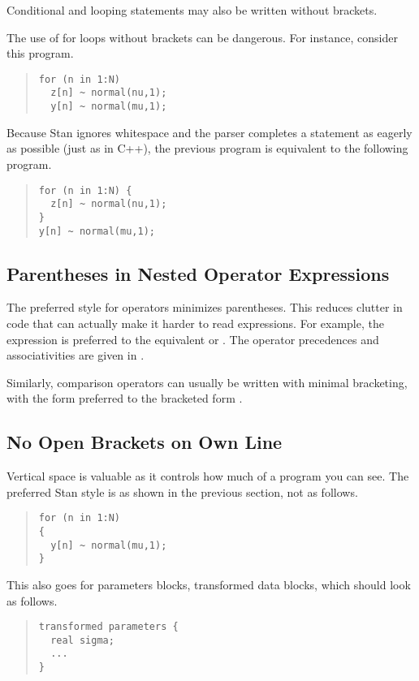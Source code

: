 Conditional and looping statements may also be written without brackets.

The use of for loops without brackets can be dangerous.  For instance,
consider this program.
%
\begin{quote}
\begin{Verbatim}  
for (n in 1:N)
  z[n] ~ normal(nu,1);
  y[n] ~ normal(mu,1);
\end{Verbatim}
\end{quote}
%
Because Stan ignores whitespace and the parser completes a statement
as eagerly as possible (just as in C++), the previous program is
equivalent to the following program.
%
\begin{quote}
\begin{Verbatim}  
for (n in 1:N) {
  z[n] ~ normal(nu,1);
}
y[n] ~ normal(mu,1);
\end{Verbatim}
\end{quote}
%


\subsection{Parentheses in Nested Operator Expressions}

The preferred style for operators minimizes parentheses.  This reduces
clutter in code that can actually make it harder to read expressions.
For example, the expression  is preferred to the
equivalent  or .  The operator
precedences and associativities are given in
.

Similarly, comparison operators can usually be written with minimal
bracketing, with the form  preferred to
the bracketed form .  

\subsection{No Open Brackets on Own Line}

Vertical space is valuable as it controls how much of a program you
can see.  The preferred Stan style is as shown in the previous
section, not as follows.
%
\begin{quote}
\begin{Verbatim}
for (n in 1:N) 
{
  y[n] ~ normal(mu,1);
}
\end{Verbatim}
\end{quote}
%
This also goes for parameters blocks, transformed data blocks, 
which should look as follows.
%
\begin{quote}
\begin{Verbatim}
transformed parameters {
  real sigma;
  ...
}
\end{Verbatim}
\end{quote}
%


